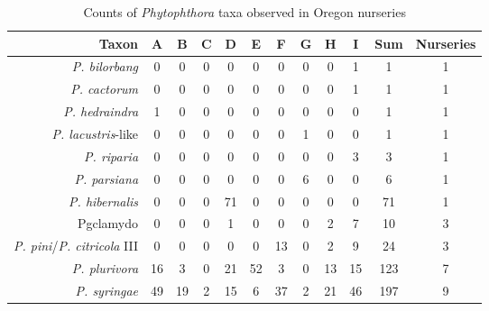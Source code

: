 \documentclass[12pt]{article}
\begin{document}
\begin{table}[ht]
\centering
\caption{Counts of \emph{Phytophthora} taxa observed in Oregon nurseries} 
\label{tab:taxa_counts}
\begin{tabular}{rccccccccccc}
  \hline
 \textbf{Taxon} & \textbf{A} & \textbf{B} & \textbf{C} & \textbf{D} & \textbf{E} & \textbf{F} & \textbf{G} & \textbf{H} & \textbf{I} & \textbf{Sum} & \textbf{Nurseries} \\ 
  \hline
  \emph{P. bilorbang} & 0 & 0 & 0 & 0 & 0 & 0 & 0 & 0 & 1 & 1 & 1 \\ 
  \emph{P. cactorum} & 0 & 0 & 0 & 0 & 0 & 0 & 0 & 0 & 1 & 1 & 1 \\ 
  \emph{P. hedraindra}  & 1 & 0 & 0 & 0 & 0 & 0 & 0 & 0 & 0 & 1 & 1 \\ 
  \emph{P. lacustris}-like & 0 & 0 & 0 & 0 & 0 & 0 & 1 & 0 & 0 & 1 & 1 \\ 
  \emph{P. riparia} & 0 & 0 & 0 & 0 & 0 & 0 & 0 & 0 & 3 & 3 & 1 \\ 
  \emph{P. parsiana} & 0 & 0 & 0 & 0 & 0 & 0 & 6 & 0 & 0 & 6 & 1 \\ 
  \emph{P. hibernalis} & 0 & 0 & 0 & 71 & 0 & 0 & 0 & 0 & 0 & 71 & 1 \\ 
  Pgclamydo & 0 & 0 & 0 & 1 & 0 & 0 & 0 & 2 & 7 & 10 & 3 \\ 
  \emph{P. pini}/\emph{P. citricola} III & 0 & 0 & 0 & 0 & 0 & 13 & 0 & 2 & 9 & 24 & 3 \\ 
  \emph{P. plurivora} & 16 & 3 & 0 & 21 & 52 & 3 & 0 & 13 & 15 & 123 & 7 \\ 
  \emph{P. syringae} & 49 & 19 & 2 & 15 & 6 & 37 & 2 & 21 & 46 & 197 & 9 \\ 
   \hline
\end{tabular}
\end{table}
\end{document}
